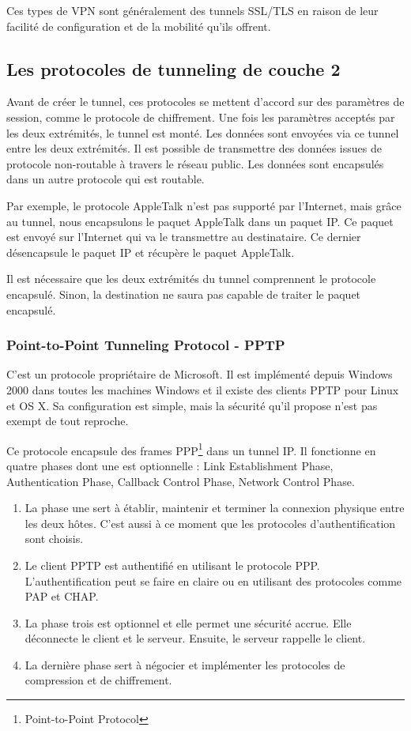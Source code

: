 Ces types de VPN sont généralement des tunnels SSL/TLS en raison de leur facilité de configuration et de la mobilité qu'ils offrent.

\subsection{Les protocoles de tunneling de couche 2}
Avant de créer le tunnel, ces protocoles se mettent d'accord sur des paramètres de session, comme le protocole de chiffrement.
Une fois les paramètres acceptés par les deux extrémités, le tunnel est monté.
Les données sont envoyées via ce tunnel entre les deux extrémités.
Il est possible de transmettre des données issues de protocole non-routable à travers le réseau public. 
Les données sont encapsulés dans un autre protocole qui est routable.

Par exemple, le protocole AppleTalk n'est pas supporté par l'Internet, mais grâce au tunnel, nous encapsulons le paquet AppleTalk dans un paquet IP. 
Ce paquet est envoyé sur l'Internet qui va le transmettre au destinataire.
Ce dernier désencapsule le paquet IP et récupère le paquet AppleTalk. 

Il est nécessaire que les deux extrémités du tunnel comprennent le protocole encapsulé.
Sinon, la destination ne saura pas capable de traiter le paquet encapsulé. 

\subsubsection{Point-to-Point Tunneling Protocol - PPTP}
C'est un protocole propriétaire de Microsoft.
Il est implémenté depuis Windows 2000 dans toutes les machines Windows et il existe des clients PPTP pour Linux et OS X.
Sa configuration est simple, mais la sécurité qu'il propose n'est pas exempt de tout reproche.

Ce protocole encapsule des frames PPP\footnote{Point-to-Point Protocol} dans un tunnel IP.
Il fonctionne en quatre phases dont une est optionnelle : Link Establishment Phase, Authentication Phase, Callback Control Phase, Network Control Phase.
\begin{enumerate}
	\item La phase une sert à établir, maintenir et terminer la connexion physique entre les deux hôtes. C'est aussi à ce moment que les protocoles d'authentification sont choisis.
	\item Le client PPTP est authentifié en utilisant le protocole PPP. L'authentification peut se faire en claire ou en utilisant des protocoles comme PAP et CHAP. 
	\item La phase trois est optionnel et elle permet une sécurité accrue. Elle déconnecte le client et le serveur. Ensuite, le serveur rappelle le client. 
	\item La dernière phase sert à négocier et implémenter les protocoles de compression et de chiffrement.
\end{enumerate}
